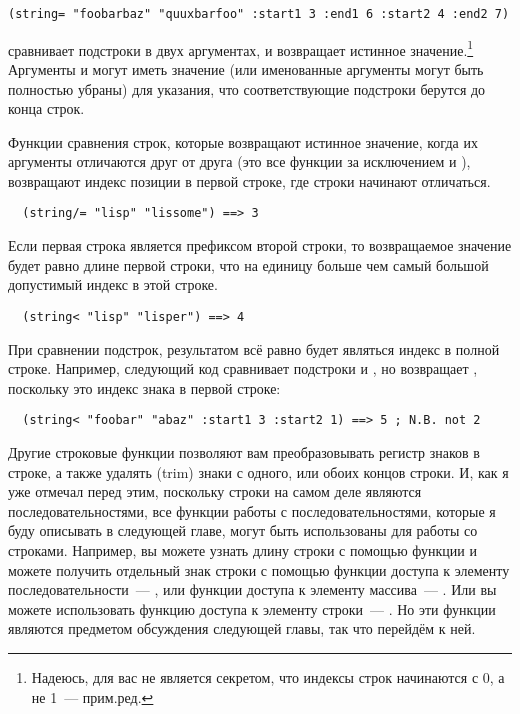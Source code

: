 \begin{lstlisting}
(string= "foobarbaz" "quuxbarfoo" :start1 3 :end1 6 :start2 4 :end2 7)
\end{lstlisting}

сравнивает подстроки  в двух аргументах, и возвращает истинное
значение.\footnote{Надеюсь, для вас не является секретом, что индексы строк начинаются с
  0, а не 1~--- прим.ред.}  Аргументы  и  могут иметь значение
 (или именованные аргументы могут быть полностью убраны) для указания, что
соответствующие подстроки берутся до конца строк.

Функции сравнения строк, которые возвращают истинное значение, когда их аргументы
отличаются друг от друга (это все функции за исключением  и
), возвращают индекс позиции в первой строке, где строки начинают
отличаться.

\begin{lstlisting}
  (string/= "lisp" "lissome") ==> 3
\end{lstlisting}

Если первая строка является префиксом второй строки, то возвращаемое значение будет равно
длине первой строки, что на единицу больше чем самый большой допустимый индекс в этой
строке.

\begin{lstlisting}
  (string< "lisp" "lisper") ==> 4
\end{lstlisting}

При сравнении подстрок, результатом всё равно будет являться индекс в полной строке.
Например, следующий код сравнивает подстроки  и , но возвращает
, поскольку это индекс знака  в первой строке:

\begin{lstlisting}
  (string< "foobar" "abaz" :start1 3 :start2 1) ==> 5 ; N.B. not 2
\end{lstlisting}

Другие строковые функции позволяют вам преобразовывать регистр знаков в строке, а также
удалять (trim) знаки с одного, или обоих концов строки.  И, как я уже отмечал перед этим,
поскольку строки на самом деле являются последовательностями, все функции работы с
последовательностями, которые я буду описывать в следующей главе, могут быть использованы
для работы со строками.  Например, вы можете узнать длину строки с помощью функции
 и можете получить отдельный знак строки с помощью функции доступа к элементу
последовательности~--- , или функции доступа к элементу массива~--- .
Или вы можете использовать функцию доступа к элементу строки~--- .  Но эти
функции являются предметом обсуждения следующей главы, так что перейдём к ней.

